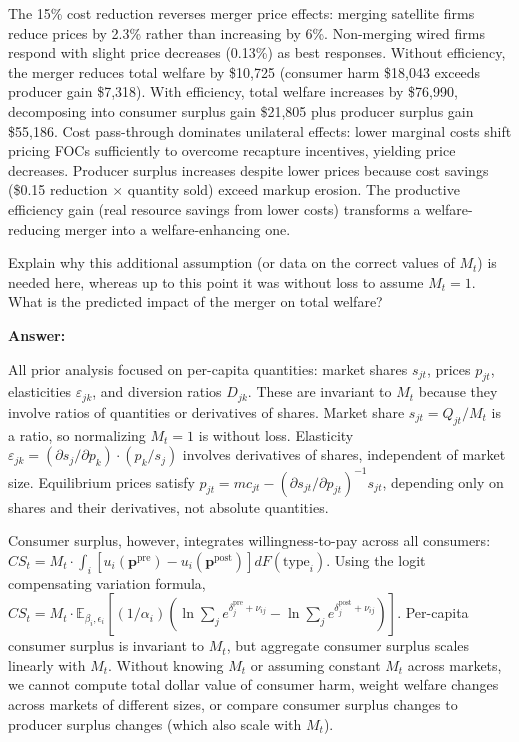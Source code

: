 \documentclass[english,11pt]{article}
\begin{document}
\begin{enumerate}
The 15\% cost reduction reverses merger price effects: merging satellite firms reduce prices by 2.3\% rather than increasing by 6\%. Non-merging wired firms respond with slight price decreases (0.13\%) as best responses. Without efficiency, the merger reduces total welfare by \$10,725 (consumer harm \$18,043 exceeds producer gain \$7,318). With efficiency, total welfare increases by \$76,990, decomposing into consumer surplus gain \$21,805 plus producer surplus gain \$55,186. Cost pass-through dominates unilateral effects: lower marginal costs shift pricing FOCs sufficiently to overcome recapture incentives, yielding price decreases. Producer surplus increases despite lower prices because cost savings (\$0.15 reduction $\times$ quantity sold) exceed markup erosion. The productive efficiency gain (real resource savings from lower costs) transforms a welfare-reducing merger into a welfare-enhancing one.

Explain why this additional assumption
(or data on the correct values of $M_{t}$) is needed here, whereas up to
this point it was without loss to assume $M_{t}=1$. What is the predicted
impact of the merger on total welfare?

\textbf{Answer:}

All prior analysis focused on per-capita quantities: market shares $s_{jt}$, prices $p_{jt}$, elasticities $\varepsilon_{jk}$, and diversion ratios $D_{jk}$. These are invariant to $M_t$ because they involve ratios of quantities or derivatives of shares. Market share $s_{jt} = Q_{jt}/M_t$ is a ratio, so normalizing $M_t = 1$ is without loss. Elasticity $\varepsilon_{jk} = (\partial s_j/\partial p_k) \cdot (p_k/s_j)$ involves derivatives of shares, independent of market size. Equilibrium prices satisfy $p_{jt} = mc_{jt} - (\partial s_{jt}/\partial p_{jt})^{-1} s_{jt}$, depending only on shares and their derivatives, not absolute quantities.

Consumer surplus, however, integrates willingness-to-pay across all consumers: $CS_t = M_t \cdot \int_i [u_i(\mathbf{p}^{\text{pre}}) - u_i(\mathbf{p}^{\text{post}})] dF(\text{type}_i)$. Using the logit compensating variation formula, $CS_t = M_t \cdot \mathbb{E}_{\beta_i, \epsilon_i} [(1/\alpha_i) (\ln \sum_j e^{\delta_j^{\text{pre}} + \nu_{ij}} - \ln \sum_j e^{\delta_j^{\text{post}} + \nu_{ij}})]$. Per-capita consumer surplus is invariant to $M_t$, but aggregate consumer surplus scales linearly with $M_t$. Without knowing $M_t$ or assuming constant $M_t$ across markets, we cannot compute total dollar value of consumer harm, weight welfare changes across markets of different sizes, or compare consumer surplus changes to producer surplus changes (which also scale with $M_t$).


\end{enumerate}
\end{document}
